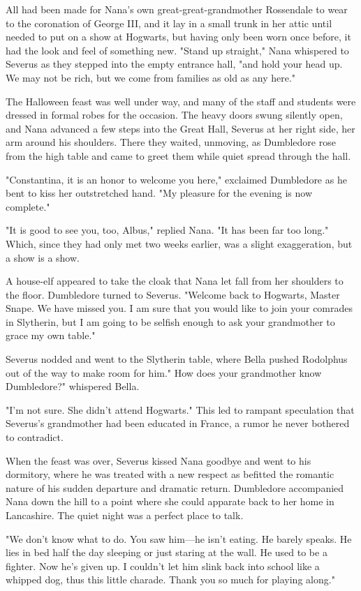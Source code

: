 All had been made for Nana's own great-great-grandmother Rossendale to wear to the coronation of George III, and it lay in a small trunk in her attic until needed to put on a show at Hogwarts, but having only been worn once before, it had the look and feel of something new. "Stand up straight," Nana whispered to Severus as they stepped into the empty entrance hall, "and hold your head up. We may not be rich, but we come from families as old as any here."

The Halloween feast was well under way, and many of the staff and students were dressed in formal robes for the occasion. The heavy doors swung silently open, and Nana advanced a few steps into the Great Hall, Severus at her right side, her arm around his shoulders. There they waited, unmoving, as Dumbledore rose from the high table and came to greet them while quiet spread through the hall.

"Constantina, it is an honor to welcome you here," exclaimed Dumbledore as he bent to kiss her outstretched hand. "My pleasure for the evening is now complete."

"It is good to see you, too, Albus," replied Nana. "It has been far too long." Which, since they had only met two weeks earlier, was a slight exaggeration, but a show is a show.

A house-elf appeared to take the cloak that Nana let fall from her shoulders to the floor. Dumbledore turned to Severus. "Welcome back to Hogwarts, Master Snape. We have missed you. I am sure that you would like to join your comrades in Slytherin, but I am going to be selfish enough to ask your grandmother to grace my own table."

Severus nodded and went to the Slytherin table, where Bella pushed Rodolphus out of the way to make room for him." How does your grandmother know Dumbledore?" whispered Bella.

"I'm not sure. She didn't attend Hogwarts." This led to rampant speculation that Severus's grandmother had been educated in France, a rumor he never bothered to contradict.

When the feast was over, Severus kissed Nana goodbye and went to his dormitory, where he was treated with a new respect as befitted the romantic nature of his sudden departure and dramatic return. Dumbledore accompanied Nana down the hill to a point where she could apparate back to her home in Lancashire. The quiet night was a perfect place to talk.

"We don't know what to do. You saw him—he isn't eating. He barely speaks. He lies in bed half the day sleeping or just staring at the wall. He used to be a fighter. Now he's given up. I couldn't let him slink back into school like a whipped dog, thus this little charade. Thank you so much for playing along."

